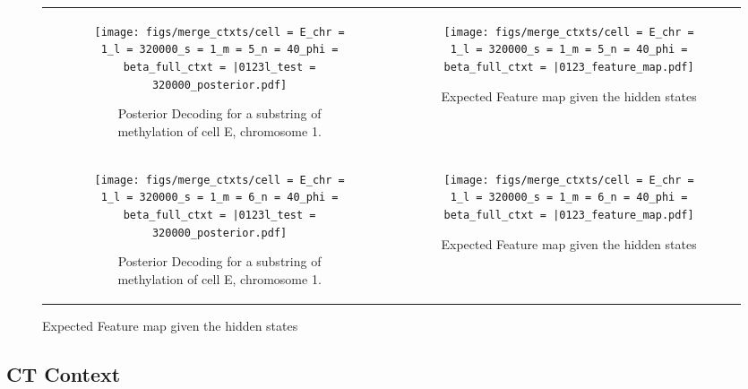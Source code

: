 \documentclass{article}
\begin{document}
    \begin{figure}[H]
        \begin{tabular}{cc}
          \begin{subfigure}[t]{0.4\textwidth}
            \texttt{[image: figs/merge\_ctxts/cell = E\_chr = 1\_l = 320000\_s = 1\_m = 5\_n = 40\_phi = beta\_full\_ctxt = |0123l\_test = 320000\_posterior.pdf]}
            \caption{Posterior Decoding for a substring of methylation of cell E, chromosome 1.}
          \end{subfigure}
          &
          \begin{subfigure}[t]{0.4\textwidth}
            \texttt{[image: figs/merge\_ctxts/cell = E\_chr = 1\_l = 320000\_s = 1\_m = 5\_n = 40\_phi = beta\_full\_ctxt = |0123\_feature\_map.pdf]}
            \caption{Expected Feature map given the hidden states}
          \end{subfigure}
      \\
      \begin{subfigure}[t]{0.4\textwidth}
        \texttt{[image: figs/merge\_ctxts/cell = E\_chr = 1\_l = 320000\_s = 1\_m = 6\_n = 40\_phi = beta\_full\_ctxt = |0123l\_test = 320000\_posterior.pdf]}
        \caption{Posterior Decoding for a substring of methylation of cell E, chromosome 1.}
      \end{subfigure}
      &
      \begin{subfigure}[t]{0.4\textwidth}
        \texttt{[image: figs/merge\_ctxts/cell = E\_chr = 1\_l = 320000\_s = 1\_m = 6\_n = 40\_phi = beta\_full\_ctxt = |0123\_feature\_map.pdf]}
        \caption{Expected Feature map given the hidden states}
      \end{subfigure}
    \end{tabular}
\end{figure}


\subsection{CT Context}
\end{document}
